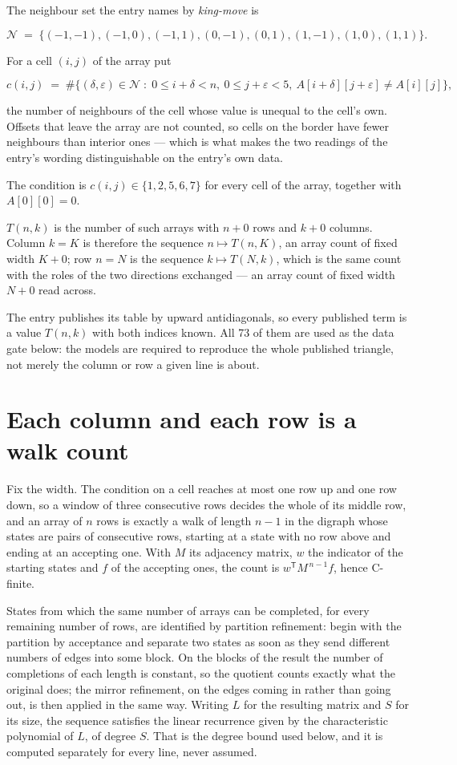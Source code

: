 \documentclass[11pt]{article}
\theoremstyle{definition}
\begin{document}
The neighbour set the entry names by {\itshape king-move} is

\[\mathcal{N} \;=\; \{(-1,-1), (-1,0), (-1,1), (0,-1), (0,1), (1,-1), (1,0), (1,1)\}.\]

For a cell $(i,j)$ of the array put

\[c(i,j) \;=\; \#\bigl\{(\delta,\varepsilon)\in\mathcal{N} \;:\; 0\le i+\delta<n,\ 0\le j+\varepsilon<5,\ A[i+\delta][j+\varepsilon] \neq A[i][j]\bigr\},\]

the number of neighbours of the cell whose value is unequal to the cell's own. Offsets that leave the array are not counted, so cells on the border have fewer neighbours than interior ones --- which is what makes the two readings of the entry's wording distinguishable on the entry's own data.

The condition is $c(i,j) \in \{1, 2, 5, 6, 7\}$ for every cell of the array, together with $A[0][0]=0$.

$T(n,k)$ is the number of such arrays with $n + 0$ rows and $k + 0$ columns. Column $k = K$ is therefore the sequence $n \mapsto T(n,K)$, an array count of fixed width $K + 0$; row $n = N$ is the sequence $k \mapsto T(N,k)$, which is the same count with the roles of the two directions exchanged --- an array count of fixed width $N + 0$ read across.

The entry publishes its table by upward antidiagonals, so every published term is a value $T(n,k)$ with both indices known. All 73 of them are used as the data gate below: the models are required to reproduce the whole published triangle, not merely the column or row a given line is about.

\section{Each column and each row is a walk count}

Fix the width. The condition on a cell reaches at most one row up and one row down, so a window of three consecutive rows decides the whole of its middle row, and an array of $n$ rows is exactly a walk of length $n-1$ in the digraph whose states are pairs of consecutive rows, starting at a state with no row above and ending at an accepting one. With $M$ its adjacency matrix, $w$ the indicator of the starting states and $f$ of the accepting ones, the count is $w^{\mathsf T}M^{\,n-1}f$, hence C-finite.

States from which the same number of arrays can be completed, for every remaining number of rows, are identified by partition refinement: begin with the partition by acceptance and separate two states as soon as they send different numbers of edges into some block. On the blocks of the result the number of completions of each length is constant, so the quotient counts exactly what the original does; the mirror refinement, on the edges coming in rather than going out, is then applied in the same way. Writing $L$ for the resulting matrix and $S$ for its size, the sequence satisfies the linear recurrence given by the characteristic polynomial of $L$, of degree $S$. That is the degree bound used below, and it is computed separately for every line, never assumed.
\end{document}
